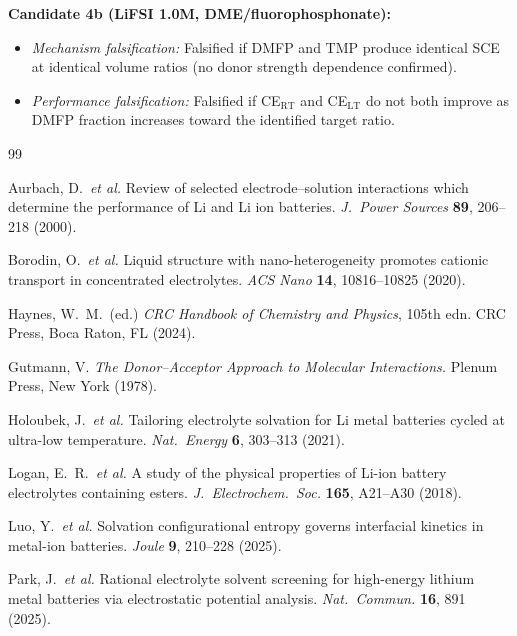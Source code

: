 \documentclass[11pt]{article}
\theoremstyle{plain}
\theoremstyle{definition}
\theoremstyle{remark}
\begin{document}
\noindent\textbf{Candidate 4b (LiFSI 1.0M, DME/fluorophosphonate):}
\begin{itemize}[leftmargin=2em]
  \item \textit{Mechanism falsification:} Falsified if DMFP and TMP
        produce identical SCE at identical volume ratios (no donor
        strength dependence confirmed).
  \item \textit{Performance falsification:} Falsified if CE$_{\mathrm{RT}}$
        and CE$_{\mathrm{LT}}$ do not both improve as DMFP fraction
        increases toward the identified target ratio.
\end{itemize}

\begin{thebibliography}{99}

Aurbach, D.\ \textit{et al.}
Review of selected electrode--solution interactions which determine the
performance of Li and Li ion batteries.
\textit{J.\ Power Sources} \textbf{89}, 206--218 (2000).

Borodin, O.\ \textit{et al.}
Liquid structure with nano-heterogeneity promotes cationic transport in
concentrated electrolytes.
\textit{ACS Nano} \textbf{14}, 10816--10825 (2020).

Haynes, W.\ M.\ (ed.)
\textit{CRC Handbook of Chemistry and Physics}, 105th edn.
CRC Press, Boca Raton, FL (2024).

Gutmann, V.
\textit{The Donor--Acceptor Approach to Molecular Interactions.}
Plenum Press, New York (1978).

Holoubek, J.\ \textit{et al.}
Tailoring electrolyte solvation for Li metal batteries cycled at
ultra-low temperature.
\textit{Nat.\ Energy} \textbf{6}, 303--313 (2021).

Logan, E.\ R.\ \textit{et al.}
A study of the physical properties of Li-ion battery electrolytes
containing esters.
\textit{J.\ Electrochem.\ Soc.} \textbf{165}, A21--A30 (2018).

Luo, Y.\ \textit{et al.}
Solvation configurational entropy governs interfacial kinetics in
metal-ion batteries.
\textit{Joule} \textbf{9}, 210--228 (2025).

Park, J.\ \textit{et al.}
Rational electrolyte solvent screening for high-energy lithium metal
batteries via electrostatic potential analysis.
\textit{Nat.\ Commun.} \textbf{16}, 891 (2025).


\end{thebibliography}
\end{document}
